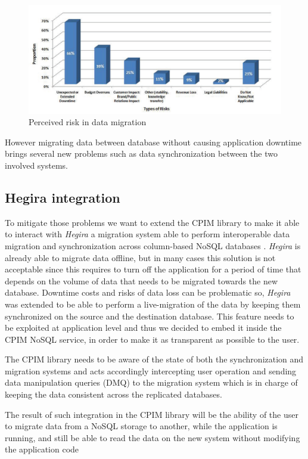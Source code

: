 \begin{figure}[tbh]
  \centering
  \includegraphics[width=13cm]{images/hitachi_survey}
  \caption{Perceived risk in data migration \cite{paper:hitachi} }
  \label{fig:cpim-nosql}
\end{figure}

\noindent However migrating data between database without causing application downtime brings several new problems such as data synchronization between the two involved systems.

\subsection{Hegira integration}
To mitigate those problems we want to extend the CPIM library to make it able to interact with \textit{Hegira} a migration system able to perform interoperable data migration and synchronization across column-based NoSQL databases \cite{paper:modaclouds-deliverable}. \textit{Hegira} is already able to migrate data offline, but in many cases this solution is not acceptable since this requires to turn off the application for a period of time that depends on the volume of data that needs to be migrated towards the new database. 
Downtime costs and risks of data loss can be problematic so, \textit{Hegira} was extended to be able to perform a live-migration of the data by keeping them synchronized on the source and the destination database.
This feature needs to be exploited at application level and thus we decided to embed it inside the CPIM NoSQL service, in order to make it as transparent as possible to the user.

\noindent The CPIM library needs to be aware of the state of both the synchronization and migration systems and acts accordingly intercepting user operation and sending data manipulation queries (DMQ) to the migration system which is in charge of keeping the data consistent across the replicated databases.

\noindent The result of such integration in the CPIM library will be the ability of the user to migrate data from a NoSQL storage to another, while the application is running, and still be able to read the data on the new system without modifying the application code